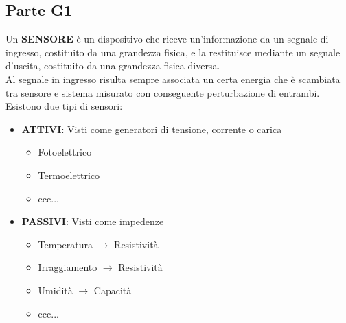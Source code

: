 \documentclass[12pt]{article}
\begin{document}
\subsection{Parte G1}\label{g1} %
Un \textbf{SENSORE} è un dispositivo che riceve un'informazione da un segnale di ingresso, costituito da una grandezza fisica, e la restituisce mediante un segnale d'uscita, costituito da una grandezza fisica diversa.\\
Al segnale in ingresso risulta sempre associata un certa energia che è scambiata tra sensore e sistema misurato con conseguente perturbazione di entrambi.\\
Esistono due tipi di sensori:
\begin{itemize}
  \item \textbf{ATTIVI}: Visti come generatori di tensione, corrente o carica
  \begin{itemize}
    \item Fotoelettrico
    \item Termoelettrico
    \item ecc...
  \end{itemize}
  \item \textbf{PASSIVI}: Visti come impedenze
  \begin{itemize}
    \item Temperatura $\rightarrow$ Resistività
    \item Irraggiamento $\rightarrow$ Resistività
    \item Umidità $\rightarrow$ Capacità
    \item ecc...
  \end{itemize}
\end{itemize}
\end{document}
